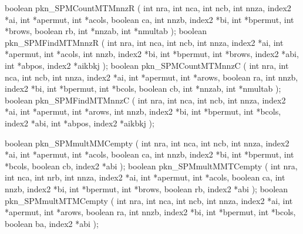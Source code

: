 \begin{listingC}
boolean pkn_SPMCountMTMnnzR ( int nra, int nca, int ncb,
                              int nnza, index2 *ai,
                              int *apermut, int *acols, boolean ca,
                              int nnzb, index2 *bi,
                              int *bpermut, int *brows, boolean rb,
                              int *nnzab, int *nmultab );
boolean pkn_SPMFindMTMnnzR ( int nra, int nca, int ncb,  
                             int nnza, index2 *ai, int *apermut, int *acols,
                             int nnzb, index2 *bi, int *bpermut, int *brows,
                             index2 *abi, int *abpos, index2 *aikbkj );
boolean pkn_SPMCountMTMnnzC ( int nra, int nca, int ncb,
                              int nnza, index2 *ai,
                              int *apermut, int *arows, boolean ra,
                              int nnzb, index2 *bi,
                              int *bpermut, int *bcols, boolean cb,
                              int *nnzab, int *nmultab );
boolean pkn_SPMFindMTMnnzC ( int nra, int nca, int ncb,  
                             int nnza, index2 *ai, int *apermut, int *arows,
                             int nnzb, index2 *bi, int *bpermut, int *bcols,
                             index2 *abi, int *abpos, index2 *aikbkj );
\end{listingC}

\begin{listingC}
boolean pkn_SPMmultMMCempty ( int nra, int nca, int ncb,
                              int nnza, index2 *ai,
                              int *apermut, int *acols, boolean ca,
                              int nnzb, index2 *bi,
                              int *bpermut, int *bcols, boolean cb,
                              index2 *abi );
boolean pkn_SPMmultMMTCempty ( int nra, int nca, int nrb,
                               int nnza, index2 *ai,
                               int *apermut, int *acols, boolean ca,
                               int nnzb, index2 *bi,
                               int *bpermut, int *brows, boolean rb,
                               index2 *abi );
boolean pkn_SPMmultMTMCempty ( int nra, int nca, int ncb,
                               int nnza, index2 *ai,
                               int *apermut, int *arows, boolean ra,
                               int nnzb, index2 *bi,
                               int *bpermut, int *bcols, boolean ba,
                               index2 *abi );
\end{listingC}

